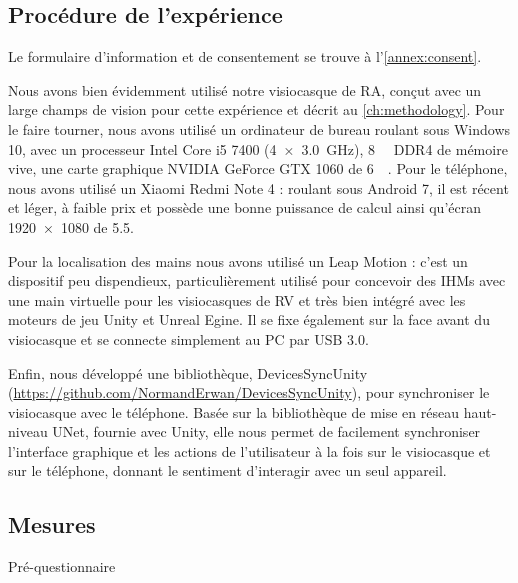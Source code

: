 \subsection{Procédure de l'expérience}
\label{subsec:experiment_procedure}
Le formulaire d'information et de consentement se trouve à l'\autoref{annex:consent}.

Nous avons bien évidemment utilisé notre visiocasque de RA, conçut avec un large champs de vision pour cette expérience et décrit au \autoref{ch:methodology}. Pour le faire tourner, nous avons utilisé un ordinateur de bureau roulant sous Windows 10, avec un processeur Intel Core i5 7400 (\SI[product-units = single]{4x3.0}{\GHz}), \SI{8}{\giga\byte} DDR4 de mémoire vive, une carte graphique NVIDIA GeForce GTX 1060 de \SI{6}{\giga\byte}. Pour le téléphone, nous avons utilisé un Xiaomi Redmi Note 4 : roulant sous Android 7, il est récent et léger, à faible prix et possède une bonne puissance de calcul ainsi qu'écran \SI{1920x1080}{\px} de \SI{5.5}{\inch}.

Pour la localisation des mains nous avons utilisé un Leap Motion : c'est un dispositif peu dispendieux, particulièrement utilisé pour concevoir des IHMs avec une main virtuelle pour les visiocasques de RV et très bien intégré avec les moteurs de jeu Unity et Unreal Egine. Il se fixe également sur la face avant du visiocasque et se connecte simplement au PC par USB 3.0.

Enfin, nous développé une bibliothèque, DevicesSyncUnity (\url{https://github.com/NormandErwan/DevicesSyncUnity}), pour synchroniser le visiocasque avec le téléphone. Basée sur la bibliothèque de mise en réseau haut-niveau UNet, fournie avec Unity, elle nous permet de facilement synchroniser l'interface graphique et les actions de l'utilisateur à la fois sur le visiocasque et sur le téléphone, donnant le sentiment d'interagir avec un seul appareil.


\subsection{Mesures}
\label{subsec:experiment_measures}
Pré-questionnaire

